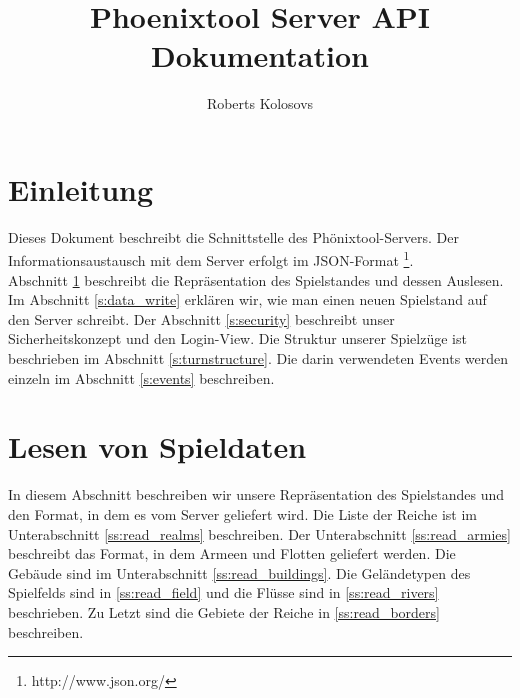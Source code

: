 \documentclass[11pt,a4paper,twocolumn]{article}
\title{Phoenixtool Server API Dokumentation}
\author{Roberts Kolosovs}
\begin{document}
\maketitle

\section*{Einleitung}
Dieses Dokument beschreibt die Schnittstelle des Phönixtool-Servers. Der Informationsaustausch mit dem Server erfolgt im JSON-Format \footnote{http://www.json.org/}.\\
Abschnitt \ref{s:data_read} beschreibt die Repräsentation des Spielstandes und dessen Auslesen. Im Abschnitt \ref{s:data_write} erklären wir, wie man einen neuen Spielstand auf den Server schreibt. Der Abschnitt \ref{s:security} beschreibt unser Sicherheitskonzept und den Login-View. Die Struktur unserer Spielzüge ist beschrieben im Abschnitt \ref{s:turnstructure}. Die darin verwendeten Events werden einzeln im Abschnitt \ref{s:events} beschreiben.

\section{Lesen von Spieldaten}\label{s:data_read}
In diesem Abschnitt beschreiben wir unsere Repräsentation des Spielstandes und den Format, in dem es vom Server geliefert wird. Die Liste der Reiche ist im Unterabschnitt \ref{ss:read_realms} beschreiben. Der Unterabschnitt \ref{ss:read_armies} beschreibt das Format, in dem Armeen und Flotten geliefert werden. Die Gebäude sind im Unterabschnitt \ref{ss:read_buildings}. Die Geländetypen des Spielfelds sind in \ref{ss:read_field} und die Flüsse sind in \ref{ss:read_rivers} beschrieben. Zu Letzt sind die Gebiete der Reiche in \ref{ss:read_borders} beschreiben.
\end{document}
